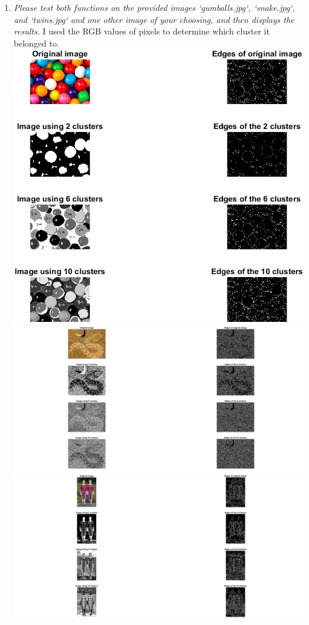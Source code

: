 \documentclass[11pt]{article}
\begin{document}
\begin{enumerate}
        \item \textit{Please test both functions on the provided images ‘gumballs.jpg‘, ‘snake.jpg‘, and ‘twins.jpg‘
        and one other image of your choosing, and then displays the results.}\newline
        I used the RGB values of pixels to determine which cluster it belonged to.\newline
        \includegraphics[width=\textwidth]{Output Pictures/gumball_kmeans}\newline
        \includegraphics[width=\textwidth]{Output Pictures/snake_kmeans}\newline
        \includegraphics[width=\textwidth]{Output Pictures/twins_kmeans}\newline

    \end{enumerate}
\end{document}
